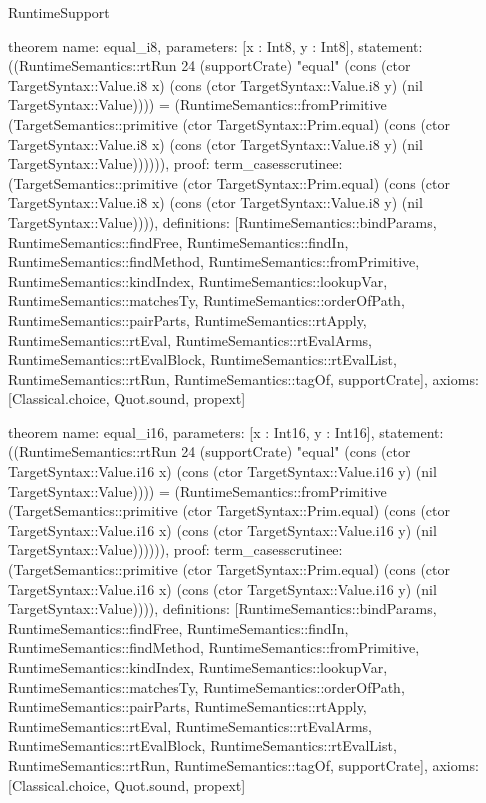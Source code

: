 \begin{lexlean}{RuntimeSupport}
\begin{semanticmodule}
theorem{
  name: equal_i8,
  parameters: [x : Int8, y : Int8],
  statement: ((RuntimeSemantics::rtRun 24 (supportCrate) "equal" (cons (ctor TargetSyntax::Value.i8 x) (cons (ctor TargetSyntax::Value.i8 y) (nil TargetSyntax::Value)))) = (RuntimeSemantics::fromPrimitive (TargetSemantics::primitive (ctor TargetSyntax::Prim.equal) (cons (ctor TargetSyntax::Value.i8 x) (cons (ctor TargetSyntax::Value.i8 y) (nil TargetSyntax::Value)))))),
  proof: term_cases{scrutinee: (TargetSemantics::primitive (ctor TargetSyntax::Prim.equal) (cons (ctor TargetSyntax::Value.i8 x) (cons (ctor TargetSyntax::Value.i8 y) (nil TargetSyntax::Value)))), definitions: [RuntimeSemantics::bindParams, RuntimeSemantics::findFree, RuntimeSemantics::findIn, RuntimeSemantics::findMethod, RuntimeSemantics::fromPrimitive, RuntimeSemantics::kindIndex, RuntimeSemantics::lookupVar, RuntimeSemantics::matchesTy, RuntimeSemantics::orderOfPath, RuntimeSemantics::pairParts, RuntimeSemantics::rtApply, RuntimeSemantics::rtEval, RuntimeSemantics::rtEvalArms, RuntimeSemantics::rtEvalBlock, RuntimeSemantics::rtEvalList, RuntimeSemantics::rtRun, RuntimeSemantics::tagOf, supportCrate]},
  axioms: [Classical.choice, Quot.sound, propext]
}

theorem{
  name: equal_i16,
  parameters: [x : Int16, y : Int16],
  statement: ((RuntimeSemantics::rtRun 24 (supportCrate) "equal" (cons (ctor TargetSyntax::Value.i16 x) (cons (ctor TargetSyntax::Value.i16 y) (nil TargetSyntax::Value)))) = (RuntimeSemantics::fromPrimitive (TargetSemantics::primitive (ctor TargetSyntax::Prim.equal) (cons (ctor TargetSyntax::Value.i16 x) (cons (ctor TargetSyntax::Value.i16 y) (nil TargetSyntax::Value)))))),
  proof: term_cases{scrutinee: (TargetSemantics::primitive (ctor TargetSyntax::Prim.equal) (cons (ctor TargetSyntax::Value.i16 x) (cons (ctor TargetSyntax::Value.i16 y) (nil TargetSyntax::Value)))), definitions: [RuntimeSemantics::bindParams, RuntimeSemantics::findFree, RuntimeSemantics::findIn, RuntimeSemantics::findMethod, RuntimeSemantics::fromPrimitive, RuntimeSemantics::kindIndex, RuntimeSemantics::lookupVar, RuntimeSemantics::matchesTy, RuntimeSemantics::orderOfPath, RuntimeSemantics::pairParts, RuntimeSemantics::rtApply, RuntimeSemantics::rtEval, RuntimeSemantics::rtEvalArms, RuntimeSemantics::rtEvalBlock, RuntimeSemantics::rtEvalList, RuntimeSemantics::rtRun, RuntimeSemantics::tagOf, supportCrate]},
  axioms: [Classical.choice, Quot.sound, propext]
}


\end{semanticmodule}
\end{lexlean}
